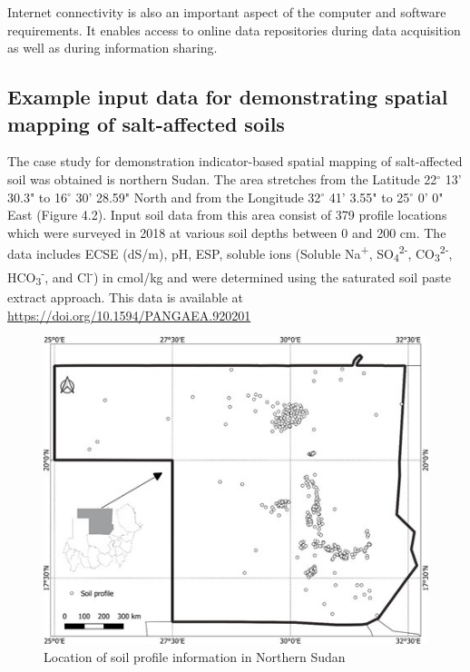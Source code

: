 \documentclass[
  10pt,
  b5paper,
]{book}
\begin{document}
Internet connectivity is also an important aspect of the computer and software requirements. It enables access to online data repositories during data acquisition as well as during information sharing.

\hypertarget{example-input-data-for-demonstrating-spatial-mapping-of-salt-affected-soils}{%
\subsection{Example input data for demonstrating spatial mapping of salt-affected soils}\label{example-input-data-for-demonstrating-spatial-mapping-of-salt-affected-soils}}

The case study for demonstration indicator-based spatial mapping of salt-affected soil was obtained is northern Sudan. The area stretches from the Latitude 22\(^\circ\) 13' 30.3" to 16\(^\circ\) 30' 28.59" North and from the Longitude 32\(^\circ\) 41' 3.55" to 25\(^\circ\) 0' 0" East (Figure 4.2). Input soil data from this area consist of 379 profile locations which were surveyed in 2018 at various soil depths between 0 and 200 cm. The data includes
ECSE (dS/m), pH, ESP, soluble ions (Soluble Na\textsuperscript{+}, SO\textsubscript{4}\textsuperscript{2-}, CO\textsubscript{3}\textsuperscript{2-}, HCO\textsubscript{3}\textsuperscript{-}, and Cl\textsuperscript{-}) in cmol/kg and were determined using the saturated soil paste extract approach. This data is available at \url{https://doi.org/10.1594/PANGAEA.920201}

\begin{figure}
\centering
\includegraphics{figures/images/Figure4.2.jpg}
\caption{Location of soil profile information in Northern Sudan}
\end{figure}
\end{document}

